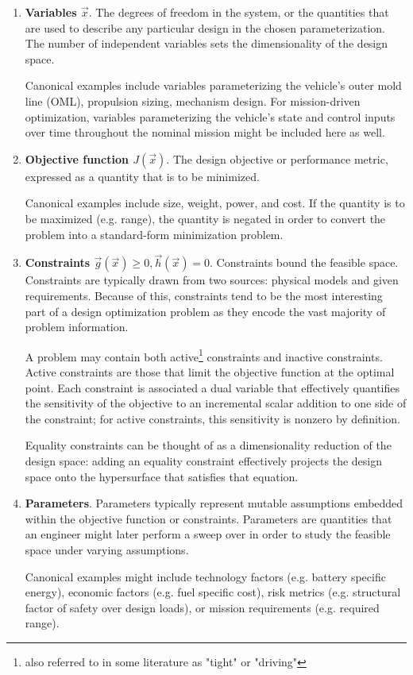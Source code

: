 \begin{enumerate}
    \item \textbf{Variables $\vec{x}$}. The degrees of freedom in the system, or the quantities that are used to describe any particular design in the chosen parameterization. The number of independent variables sets the dimensionality of the design space.

    Canonical examples include variables parameterizing the vehicle's outer mold line (OML), propulsion sizing, mechanism design. For mission-driven optimization, variables parameterizing the vehicle's state and control inputs over time throughout the nominal mission might be included here as well.

    \item \textbf{Objective function $J(\vec{x})$}. The design objective or performance metric, expressed as a quantity that is to be minimized.

    Canonical examples include size, weight, power, and cost. If the quantity is to be maximized (e.g. range), the quantity is negated in order to convert the problem into a standard-form minimization problem.

    \item \textbf{Constraints $\vec{g}(\vec{x}) \geq 0, \vec{h}(\vec{x}) = 0$}. Constraints bound the feasible space. Constraints are typically drawn from two sources: physical models and given requirements. Because of this, constraints tend to be the most interesting part of a design optimization problem as they encode the vast majority of problem information.

    A problem may contain both active\footnote{also referred to in some literature as "tight" or "driving"} constraints and inactive constraints. Active constraints are those that limit the objective function at the optimal point. Each constraint is associated a dual variable that effectively quantifies the sensitivity of the objective to an incremental scalar addition to one side of the constraint; for active constraints, this sensitivity is nonzero by definition.

    Equality constraints can be thought of as a dimensionality reduction of the design space: adding an equality constraint effectively projects the design space onto the hypersurface that satisfies that equation.

    \item \textbf{Parameters}. Parameters typically represent mutable assumptions embedded within the objective function or constraints. Parameters are quantities that an engineer might later perform a sweep over in order to study the feasible space under varying assumptions.

    Canonical examples might include technology factors (e.g. battery specific energy), economic factors (e.g. fuel specific cost), risk metrics (e.g. structural factor of safety over design loads), or mission requirements (e.g. required range).

\end{enumerate}

